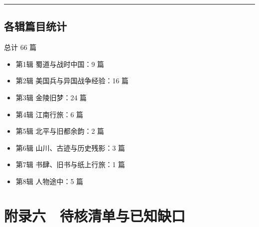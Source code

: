 \documentclass[UTF8,fontset=none,zihao=-4,a4paper]{ctexart}
\begin{document}
\medskip\hrule\medskip

\subsection{各辑篇目统计}


总计 66 篇


\begin{itemize}
\item 第1辑 蜀道与战时中国：9 篇
\item 第2辑 美国兵与异国战争经验：16 篇
\item 第3辑 金陵旧梦：24 篇
\item 第4辑 江南行旅：6 篇
\item 第5辑 北平与旧都余韵：2 篇
\item 第6辑 山川、古迹与历史残影：3 篇
\item 第7辑 书肆、旧书与纸上行旅：1 篇
\item 第8辑 人物途中：5 篇
\end{itemize}


\section{附录六　待核清单与已知缺口}
\end{document}
